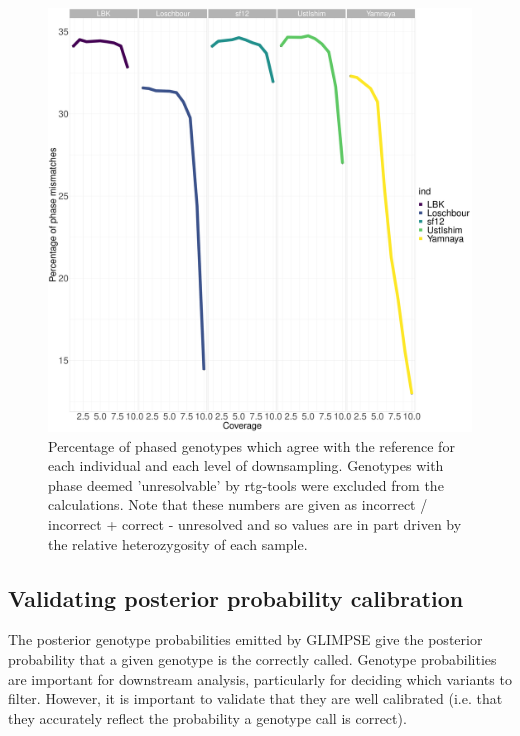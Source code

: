 \begin{figure}[htp]
    \centering
    \includegraphics[width=1.0\textwidth]{../images/chapter1/phasing_performance_downsampled.pdf}
    \caption{Percentage of phased genotypes which agree with the reference for each individual and each level of downsampling. Genotypes with phase deemed 'unresolvable' by rtg-tools were excluded from the calculations. Note that these numbers are given as incorrect / incorrect + correct - unresolved and so values are in part driven by the relative heterozygosity of each sample.}
    \label{fig:phasing_performance_downsampled}
\end{figure}

\subsection{Validating posterior probability calibration}

The posterior genotype probabilities emitted by GLIMPSE give the posterior probability that a given genotype is the correctly called. Genotype probabilities are important for downstream analysis, particularly for deciding which variants to filter. However, it is important to validate that they are well calibrated (i.e. that they accurately reflect the probability a genotype call is correct).

